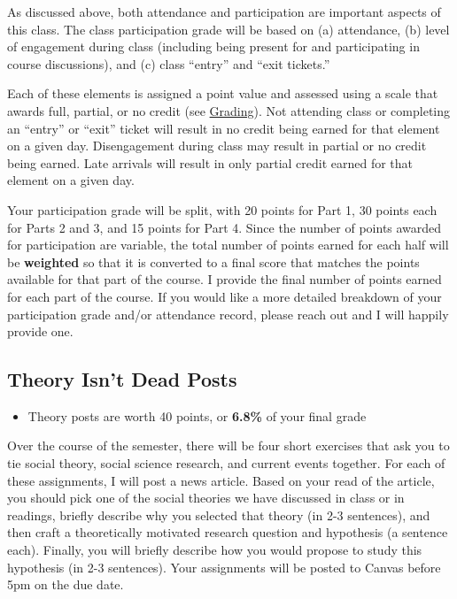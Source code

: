 \documentclass[
]{book}
\newenvironment{rmdblock}[1]
  {\begin{shaded*}
  \begin{itemize}
  \renewcommand{\labelitemi}{
    \raisebox{-.7\height}[0pt][0pt]{
      {\setkeys{Gin}{width=3em,keepaspectratio}\texttt{[image: images/\#1]}}
    }
  }
  \item
  }
  {
  \end{itemize}
  \end{shaded*}
  }
\newenvironment{rmdtip}
  {\begin{rmdblock}{tip}}
  {\end{rmdblock}}
\begin{document}
As discussed above, both attendance and participation are important aspects of this class. The class participation grade will be based on (a) attendance, (b) level of engagement during class (including being present for and participating in course discussions), and (c) class ``entry'' and ``exit tickets.''

Each of these elements is assigned a point value and assessed using a scale that awards full, partial, or no credit (see \href{grading.html}{Grading}). Not attending class or completing an ``entry'' or ``exit'' ticket will result in no credit being earned for that element on a given day. Disengagement during class may result in partial or no credit being earned. Late arrivals will result in only partial credit earned for that element on a given day.

Your participation grade will be split, with 20 points for Part 1, 30 points each for Parts 2 and 3, and 15 points for Part 4. Since the number of points awarded for participation are variable, the total number of points earned for each half will be \textbf{weighted} so that it is converted to a final score that matches the points available for that part of the course. I provide the final number of points earned for each part of the course. If you would like a more detailed breakdown of your participation grade and/or attendance record, please reach out and I will happily provide one.

\hypertarget{theory-isnt-dead-posts}{%
\subsection{Theory Isn't Dead Posts}\label{theory-isnt-dead-posts}}

\begin{rmdtip}
Theory posts are worth 40 points, or \textbf{6.8\%} of your final grade
\end{rmdtip}

Over the course of the semester, there will be four short exercises that ask you to tie social theory, social science research, and current events together. For each of these assignments, I will post a news article. Based on your read of the article, you should pick one of the social theories we have discussed in class or in readings, briefly describe why you selected that theory (in 2-3 sentences), and then craft a theoretically motivated research question and hypothesis (a sentence each). Finally, you will briefly describe how you would propose to study this hypothesis (in 2-3 sentences). Your assignments will be posted to Canvas before 5pm on the due date.
\end{document}
